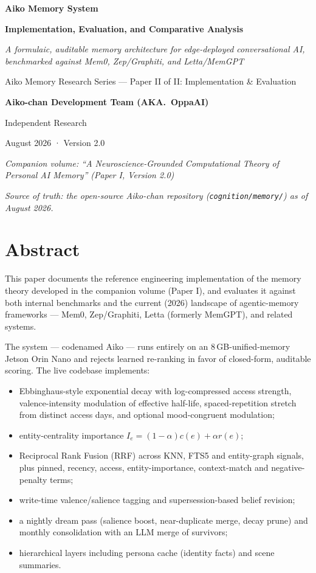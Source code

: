 \documentclass[]{article}
\title{}
\date{}
\begin{document}
\textbf{Aiko Memory System}

\textbf{Implementation, Evaluation, and Comparative Analysis}

\emph{A formulaic, auditable memory architecture for edge-deployed
conversational AI, benchmarked against Mem0, Zep/Graphiti, and
Letta/MemGPT}

Aiko Memory Research Series --- Paper II of II: Implementation \&
Evaluation

\textbf{Aiko-chan Development Team (AKA.\ OppaAI)}

Independent Research

August 2026 · Version 2.0

\emph{Companion volume: ``A Neuroscience-Grounded Computational Theory
of Personal AI Memory'' (Paper I, Version 2.0)}

\emph{Source of truth: the open-source Aiko-chan repository
(\texttt{cognition/memory/}) as of August 2026.}

\hypertarget{abstract}{%
\section{\texorpdfstring{\textbf{Abstract}}{Abstract}}\label{abstract}}

This paper documents the reference engineering implementation of the
memory theory developed in the companion volume (Paper I), and evaluates
it against both internal benchmarks and the current (2026) landscape of
agentic-memory frameworks --- Mem0, Zep/Graphiti, Letta (formerly
MemGPT), and related systems.

The system --- codenamed Aiko --- runs entirely on an 8\,GB-unified-memory
Jetson Orin Nano and rejects learned re-ranking in favor of closed-form,
auditable scoring. The live codebase implements:

\begin{itemize}
\item Ebbinghaus-style exponential decay with log-compressed access strength,
  valence-intensity modulation of effective half-life, spaced-repetition
  stretch from distinct access days, and optional mood-congruent
  modulation;
\item entity-centrality importance \(I_e=(1-\alpha)c(e)+\alpha r(e)\);
\item Reciprocal Rank Fusion (RRF) across KNN, FTS5 and entity-graph
  signals, plus pinned, recency, access, entity-importance, context-match
  and negative-penalty terms;
\item write-time valence/salience tagging and supersession-based belief
  revision;
\item a nightly dream pass (salience boost, near-duplicate merge, decay
  prune) and monthly consolidation with an LLM merge of survivors;
\item hierarchical layers including persona cache (identity facts) and
  scene summaries.
\end{itemize}
\end{document}
